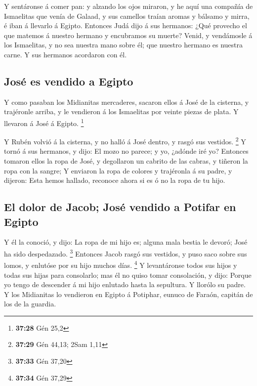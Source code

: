  Y sentáronse á comer pan: y alzando los ojos miraron, y
he aquí una compañía de Ismaelitas que venía de Galaad, y sus camellos
traían aromas y bálsamo y mirra, é iban á llevarlo á Egipto.
 Entonces Judá dijo á sus hermanos: ¿Qué provecho el que
matemos á nuestro hermano y encubramos su muerte?  Venid,
y vendámosle á los Ismaelitas, y no sea nuestra mano sobre él; que
nuestro hermano es nuestra carne. Y sus hermanos acordaron con él.

\hypertarget{josuxe9-es-vendido-a-egipto}{%
\subsection{José es vendido a
Egipto}\label{josuxe9-es-vendido-a-egipto}}

 Y como pasaban los Midianitas mercaderes, sacaron ellos
á José de la cisterna, y trajéronle arriba, y le vendieron á los
Ismaelitas por veinte piezas de plata. Y llevaron á José á Egipto.
\footnote{\textbf{37:28} Gén 25,2}

 Y Rubén volvió á la cisterna, y no halló á José dentro,
y rasgó sus vestidos. \footnote{\textbf{37:29} Gén 44,13; 2Sam 1,11}
 Y tornó á sus hermanos, y dijo: El mozo no parece; y yo,
¿adónde iré yo?  Entonces tomaron ellos la ropa de José,
y degollaron un cabrito de las cabras, y tiñeron la ropa con la sangre;
 Y enviaron la ropa de colores y trajéronla á su padre, y
dijeron: Esta hemos hallado, reconoce ahora si es ó no la ropa de tu
hijo.

\hypertarget{el-dolor-de-jacob-josuxe9-vendido-a-potifar-en-egipto}{%
\subsection{El dolor de Jacob; José vendido a Potifar en
Egipto}\label{el-dolor-de-jacob-josuxe9-vendido-a-potifar-en-egipto}}

 Y él la conoció, y dijo: La ropa de mi hijo es; alguna
mala bestia le devoró; José ha sido despedazado. \footnote{\textbf{37:33}
  Gén 37,20}  Entonces Jacob rasgó sus vestidos, y puso
saco sobre sus lomos, y enlutóse por su hijo muchos días. \footnote{\textbf{37:34}
  Gén 37,29}  Y levantáronse todos sus hijos y todas sus
hijas para consolarlo; mas él no quiso tomar consolación, y dijo: Porque
yo tengo de descender á mi hijo enlutado hasta la sepultura. Y llorólo
su padre.  Y los Midianitas lo vendieron en Egipto á
Potiphar, eunuco de Faraón, capitán de los de la guardia.

